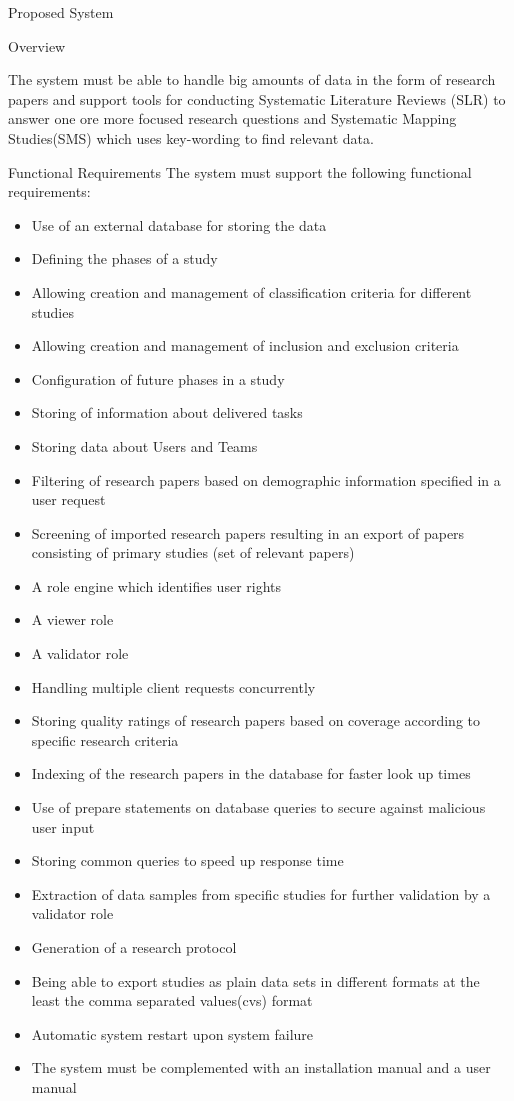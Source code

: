 \documentclass{article}
\begin{document}
\begin{section}{Proposed System}
\begin{subsection}{Overview}

The system must be able to handle big amounts of data in the form of research papers and support tools for conducting Systematic Literature Reviews (SLR) to answer one ore more focused research questions and Systematic Mapping Studies(SMS) which uses key-wording to find relevant data.

\end{subsection}

\begin{subsection}{Functional Requirements}
The system must support the following functional requirements:

\begin{itemize}
\item Use of an external database for storing the data
\item Defining the phases of a study
\item Allowing creation and management of classification criteria for different studies
\item Allowing creation and management of inclusion and exclusion criteria
\item Configuration of future phases in a study
\item Storing of information about delivered tasks
\item Storing data about Users and Teams
\item Filtering of research papers based on demographic information specified in a user request
\item Screening of imported research papers resulting in an export of papers consisting of primary studies (set of relevant papers)
\item A role engine which identifies user rights
\item A viewer role
\item A validator role
\item Handling multiple client requests concurrently
\item Storing quality ratings of research papers based on coverage according to specific research criteria
\item Indexing of the research papers in the database for faster look up times
\item Use of prepare statements on database queries to secure against malicious user input
\item Storing common queries to speed up response time
\item Extraction of data samples from specific studies for further validation by a validator role
\item Generation of a research protocol
\item Being able to export studies as plain data sets in different formats at the least the comma separated values(cvs) format
\item Automatic system restart upon system failure
\item The system must be complemented with an installation manual and a user manual


\end{itemize}
\end{subsection}
\end{section}
\end{document}
